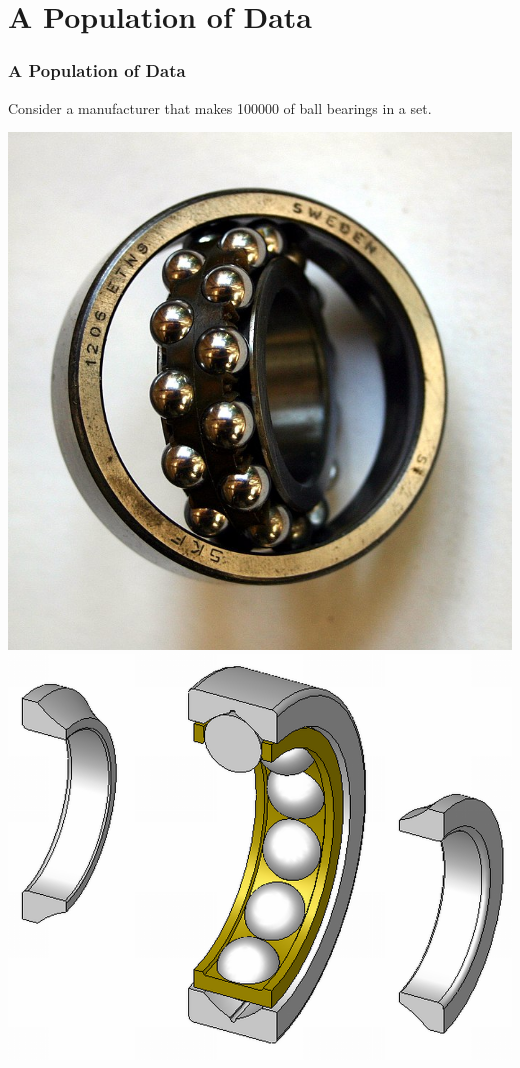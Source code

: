\documentclass[fleqn]{beamer} %
\newcommand{\sectiontitleI}{A Population of Data}
\begin{document}
\section{\sectiontitleI}	
	\begin{frame}[label=sectionI] \small
		\frametitle{\sectiontitleI}    
		
		Consider a manufacturer that makes 100000 of ball bearings in a set. \vspace{3mm}
		
		\includegraphics[scale=.1]{bearing_fig1.jpg} \hspace{10mm}
		\includegraphics[scale=.1]{bearing_fig2.png} \hspace{10mm}

\end{frame}
\end{document}
